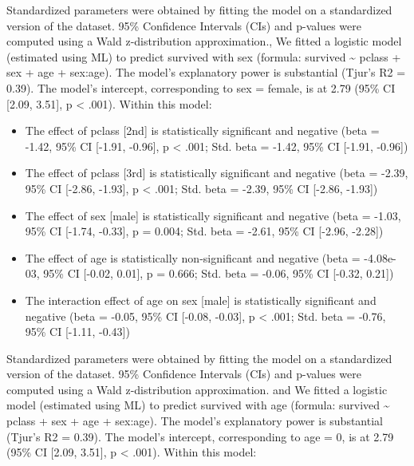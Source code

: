 \documentclass[
  11pt,
  a4paper,
  twoside]{scrbook}
\providecommand{\tightlist}{%
  \setlength{\itemsep}{0pt}\setlength{\parskip}{0pt}}
\begin{document}
Standardized parameters were obtained by fitting the model
on a standardized version of the dataset. 95\% Confidence
Intervals (CIs) and p-values were computed using a Wald
z-distribution approximation., We fitted a logistic model
(estimated using ML) to predict survived with sex (formula:
survived \textasciitilde{} pclass + sex + age + sex:age). The model's
explanatory power is substantial (Tjur's R2 = 0.39). The
model's intercept, corresponding to sex = female, is at
2.79 (95\% CI {[}2.09, 3.51{]}, p \textless{} .001). Within this model:

\begin{itemize}
\tightlist
\item
  The effect of pclass {[}2nd{]} is statistically significant
  and negative (beta = -1.42, 95\% CI {[}-1.91, -0.96{]}, p \textless{}
  .001; Std. beta = -1.42, 95\% CI {[}-1.91, -0.96{]})
\item
  The effect of pclass {[}3rd{]} is statistically significant
  and negative (beta = -2.39, 95\% CI {[}-2.86, -1.93{]}, p \textless{}
  .001; Std. beta = -2.39, 95\% CI {[}-2.86, -1.93{]})
\item
  The effect of sex {[}male{]} is statistically significant and
  negative (beta = -1.03, 95\% CI {[}-1.74, -0.33{]}, p = 0.004;
  Std. beta = -2.61, 95\% CI {[}-2.96, -2.28{]})
\item
  The effect of age is statistically non-significant and
  negative (beta = -4.08e-03, 95\% CI {[}-0.02, 0.01{]}, p =
  0.666; Std. beta = -0.06, 95\% CI {[}-0.32, 0.21{]})
\item
  The interaction effect of age on sex {[}male{]} is
  statistically significant and negative (beta = -0.05, 95\%
  CI {[}-0.08, -0.03{]}, p \textless{} .001; Std. beta = -0.76, 95\% CI
  {[}-1.11, -0.43{]})
\end{itemize}

Standardized parameters were obtained by fitting the model
on a standardized version of the dataset. 95\% Confidence
Intervals (CIs) and p-values were computed using a Wald
z-distribution approximation. and We fitted a logistic
model (estimated using ML) to predict survived with age
(formula: survived \textasciitilde{} pclass + sex + age + sex:age). The
model's explanatory power is substantial (Tjur's R2 =
0.39). The model's intercept, corresponding to age = 0, is
at 2.79 (95\% CI {[}2.09, 3.51{]}, p \textless{} .001). Within this model:
\end{document}
